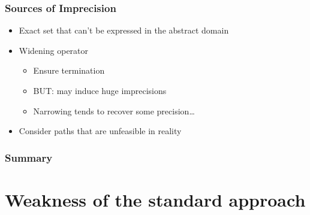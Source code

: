 \documentclass{beamer}
\begin{document}
\begin{frame}
\frametitle{Sources of Imprecision}
\begin{itemize}
\item<1-> Exact set that can't be expressed in the abstract domain
\item<2-> \alert<4>{Widening operator}
\begin{itemize}
\item Ensure termination
\item BUT: may induce huge imprecisions
\item Narrowing tends to recover some precision\ldots
\end{itemize}
\item<3-> \alert<4>{Consider paths that are unfeasible in reality}
\end{itemize}
\end{frame}

\begin{frame}
\frametitle{Summary}
\tableofcontents
\end{frame}


\section[Standard Approach]{Weakness of the standard approach}
\end{document}
